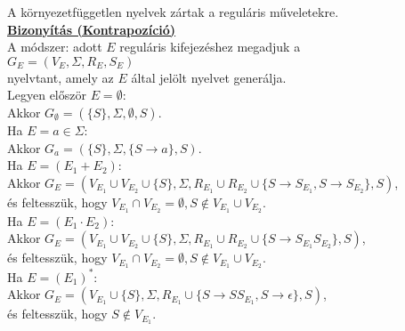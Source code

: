 \begin{frame}
\begin{tcolorbox}[squeezed title={Tétel: Környezetfüggetlen nyelvek műveleti zártsága}]
A környezetfüggetlen nyelvek zártak a reguláris műveletekre.\\
\tcblower
\msmallskip
\underline{\textbf{Bizonyítás (Kontrapozíció)}}\\
\mmedskip
A módszer: adott $E$ reguláris kifejezéshez megadjuk a\\
$G_E = (V_E, {\Sigma}, R_E, S_E)$\\
nyelvtant, amely az $E$ által jelölt nyelvet generálja.\\
\mbigskip
Legyen először $E = \emptyset$:\\
Akkor $G_{\emptyset} = (\{S\}, {\Sigma}, \emptyset, S)$.\\
\mbigskip
Ha $E = a \in {\Sigma}$:\\
Akkor $G_a = (\{S\}, {\Sigma}, \{S \rightarrow a\}, S)$.\\
\mbigskip
Ha $E = (E_1 + E_2)$:\\
Akkor $G_E = (V_{E_1} \cup V_{E_2} \cup \{S\}, \Sigma, R_{E_1} \cup R_{E_2} \cup \{S \rightarrow S_{E_1}, S \rightarrow S_{E_2}\}, S)$,\\
és feltesszük, hogy $V_{E_1} \cap V_{E_2} = {\emptyset}, S \notin V_{E_1} \cup V_{E_2}$.\\
\mbigskip
Ha $E = (E_1 \cdot E_2)$:\\
Akkor $G_E = (V_{E_1} \cup V_{E_2} \cup \{S\}, \Sigma, R_{E_1} \cup R_{E_2} \cup \{S \rightarrow S_{E_1}S_{E_2}\}, S)$,\\
és feltesszük, hogy $V_{E_1} \cap V_{E_2} = {\emptyset}, S \notin V_{E_1} \cup V_{E_2}$.\\
\mbigskip
Ha $E = (E_1)^*$:\\
Akkor $G_E = (V_{E_1} \cup \{S\}, \Sigma, R_{E_1} \cup \{S \rightarrow SS_{E_1}, S \rightarrow \epsilon \}, S)$,\\
és feltesszük, hogy $S \notin V_{E_1}$.\\

\end{tcolorbox}
\end{frame}

